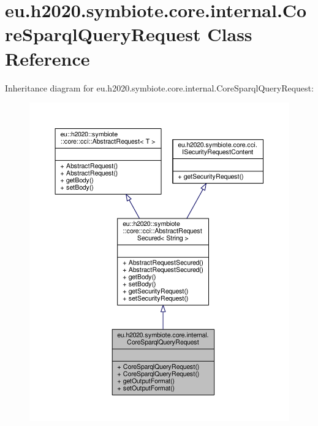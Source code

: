 \hypertarget{classeu_1_1h2020_1_1symbiote_1_1core_1_1internal_1_1CoreSparqlQueryRequest}{}\section{eu.\+h2020.\+symbiote.\+core.\+internal.\+Core\+Sparql\+Query\+Request Class Reference}
\label{classeu_1_1h2020_1_1symbiote_1_1core_1_1internal_1_1CoreSparqlQueryRequest}


Inheritance diagram for eu.\+h2020.\+symbiote.\+core.\+internal.\+Core\+Sparql\+Query\+Request\+:
\nopagebreak
\begin{figure}[H]
\begin{center}
\leavevmode
\includegraphics[width=350pt]{classeu_1_1h2020_1_1symbiote_1_1core_1_1internal_1_1CoreSparqlQueryRequest__inherit__graph}
\end{center}
\end{figure}



